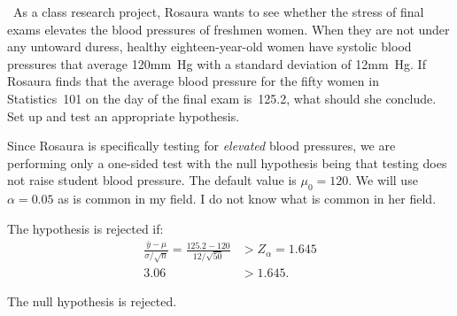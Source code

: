 \begin{problem}
  ~As a class research project, Rosaura wants to see whether the stress of final exams elevates the blood pressures of freshmen women.  When they are not under any untoward duress, healthy eighteen-year-old women have systolic blood pressures that average 120mm~Hg with a standard deviation of 12mm~Hg.  If Rosaura finds that the average blood pressure for the fifty women in Statistics~101 on the day of the final exam is~125.2, what should she conclude.  Set up and test an appropriate hypothesis.
\end{problem}

\noindent
Since Rosaura is specifically testing for \textit{elevated} blood pressures, we are performing only a one-sided test with the null hypothesis being that testing does not raise student blood pressure.  The default value is ${\mu_0 = 120}$.  We will use ~${\alpha=0.05}$ as is common in my field.  I do not know what is common in her field.

\noindent
The hypothesis is rejected if:
\begin{align*}
  \frac{\bar{y} - \mu}{\sigma / \sqrt{n}} = \frac{125.2 - 120}{12 / \sqrt{50}} &> Z_{\alpha} = 1.645 \\
  3.06 &> 1.645\text{.}
\end{align*}

\noindent
The null hypothesis is rejected.
